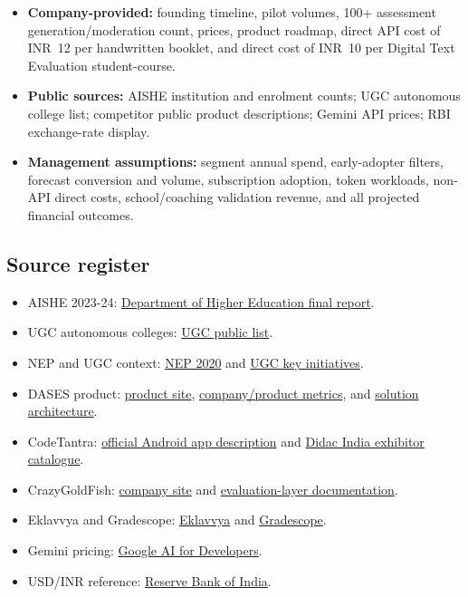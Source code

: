 \documentclass[11pt,a4paper]{article}
\newcommand{\rs}{INR}
\newcommand{\source}[2]{\href{#1}{#2}}
\begin{document}
\begin{itemize}
  \item \textbf{Company-provided:} founding timeline, pilot volumes, 100+ assessment generation/moderation count, prices, product roadmap, direct API cost of \rs\ 12 per handwritten booklet, and direct cost of \rs\ 10 per Digital Text Evaluation student-course.
  \item \textbf{Public sources:} AISHE institution and enrolment counts; UGC autonomous college list; competitor public product descriptions; Gemini API prices; RBI exchange-rate display.
  \item \textbf{Management assumptions:} segment annual spend, early-adopter filters, forecast conversion and volume, subscription adoption, token workloads, non-API direct costs, school/coaching validation revenue, and all projected financial outcomes.
\end{itemize}

\subsection{Source register}

\begingroup
\small
\begin{multicols}{2}
\begin{itemize}
  \setlength{\itemsep}{0.08em}
  \item AISHE 2023-24: \source{https://www.dohe-education.gov.in/static/uploads/2026/07/8616f33dfee644ab6b87a2bd0658b18d.pdf}{Department of Higher Education final report}.
  \item UGC autonomous colleges: \source{https://www.ugc.gov.in/colleges/Autonomous_Colleges_list}{UGC public list}.
  \item NEP and UGC context: \source{https://www.dohe-education.gov.in/department/nep/details/national-education-policy-2020-QzN1IzMtQWa}{NEP 2020} and \source{https://www.ugc.gov.in/KeyInitiative}{UGC key initiatives}.
  \item DASES product: \source{https://www.dasesai.com/}{product site}, \source{https://www.dasesai.com/about}{company/product metrics}, and \source{https://www.dasesai.com/solutions}{solution architecture}.
  \item CodeTantra: \source{https://play.google.com/store/apps/details?id=com.codetantra.seam}{official Android app description} and \source{https://didacindia.com/}{Didac India exhibitor catalogue}.
  \item CrazyGoldFish: \source{https://crazygoldfish.com/}{company site} and \source{https://docs.crazygoldfish.com/products/evaluation-layer-overview}{evaluation-layer documentation}.
  \item Eklavvya and Gradescope: \source{https://www.eklavvya.com/}{Eklavvya} and \source{https://www.gradescope.com/}{Gradescope}.
  \item Gemini pricing: \source{https://ai.google.dev/gemini-api/docs/pricing}{Google AI for Developers}.
  \item USD/INR reference: \source{https://www.rbi.org.in/}{Reserve Bank of India}.
\end{itemize}
\end{multicols}
\endgroup
\end{document}
